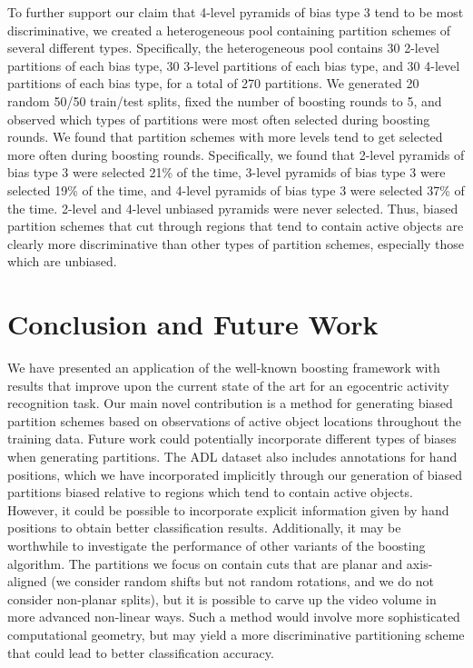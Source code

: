 \documentclass{bmvc2k}
\begin{document}
  To further support our claim that 4-level pyramids of bias type 3 tend to be most
  discriminative, we created a heterogeneous pool containing partition
  schemes of
  several different types. Specifically, the heterogeneous pool contains 30 2-level
  partitions of each bias type, 30 3-level partitions of each bias type, and
  30 4-level partitions of each bias type, for a total of 270 partitions.
  We generated 20 random 50/50 train/test splits, fixed the number of
  boosting rounds to 5, and observed which types of partitions were most
  often selected during boosting rounds.
  We found that partition schemes with more levels tend to get selected more
  often during boosting rounds.
  Specifically, we found that 2-level pyramids of bias type 3 were selected
  21\% of the time, 3-level pyramids of bias type 3 were selected 19\% of
  the time, and 4-level pyramids of bias type 3 were selected 37\% of the
  time. 2-level and 4-level unbiased pyramids were never selected. Thus,
  biased partition schemes that cut through regions that tend to contain
  active objects are clearly more discriminative than other types of
  partition schemes, especially those which are unbiased.
	
\section{Conclusion and Future Work}
	We have presented an application of the well-known boosting framework
	with results that improve upon the current state of the art for an
  egocentric activity recognition task.
	Our main novel contribution is a method for generating biased partition
	schemes based on observations of active object locations throughout the
  training data.
	Future work could potentially incorporate different types of biases when generating
	partitions. The ADL dataset also includes annotations for hand positions,
	which we have incorporated implicitly through our generation of biased partitions
	biased relative to regions which tend to contain active objects. However,
	it could be possible to incorporate explicit information given by hand
	positions to obtain better classification results.
	Additionally, it may be worthwhile to investigate the performance of other
	variants of the boosting algorithm.
	The partitions we focus on contain cuts that are
  planar and axis-aligned (we consider random shifts but not random
  rotations, and we do not consider non-planar splits),
  but it is possible to carve up the
	video volume in more advanced non-linear ways. Such a method would involve more
	sophisticated computational geometry, but may yield a more discriminative
	partitioning scheme that could lead to better classification accuracy.


\end{document}
